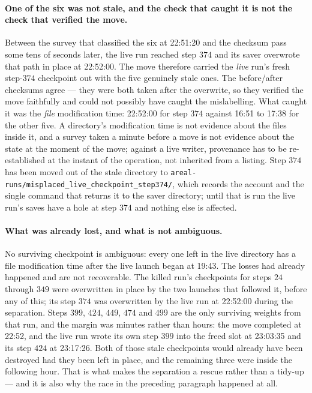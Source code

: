 \paragraph{One of the six was not stale, and the check that caught it is not the check that
verified the move.} Between the survey that classified the six at 22:51:20 and the checksum
pass some tens of seconds later, the live run reached step $374$ and its saver overwrote that
path in place at 22:52:00. The move therefore carried the \emph{live} run's fresh step-$374$
checkpoint out with the five genuinely stale ones. The before/after checksums agree --- they
were both taken after the overwrite, so they verified the move faithfully and could not
possibly have caught the mislabelling. What caught it was the \emph{file} modification time:
22:52:00 for step $374$ against 16:51 to 17:38 for the other five. A directory's modification
time is not evidence about the files inside it, and a survey taken a minute before a move is not
evidence about the state at the moment of the move; against a live writer, provenance has to be
re-established at the instant of the operation, not inherited from a listing. Step $374$ has
been moved out of the stale directory to
\texttt{areal-runs/\allowbreak misplaced\_live\_\allowbreak checkpoint\_step374/}, which records the account and the
single command that returns it to the saver directory; until that is run the live run's saves
have a hole at step $374$ and nothing else is affected.

\paragraph{What was already lost, and what is not ambiguous.} No surviving checkpoint is
ambiguous: every one left in the live directory has a file modification time after the live
launch began at 19:43. The losses had already happened and are not recoverable. The killed
run's checkpoints for steps $24$ through $349$ were overwritten in place by the two launches
that followed it, before any of this; its step $374$ was overwritten by the live run at
22:52:00 during the separation. Steps $399$, $424$, $449$, $474$ and $499$ are the only
surviving weights from that run, and the margin was minutes rather than hours: the move
completed at 22:52, and the live run wrote its own step $399$ into the freed slot at 23:03:35
and its step $424$ at 23:17:26. Both of those stale checkpoints would already have been
destroyed had they been left in place, and the remaining three were inside the following hour.
That is what makes the separation a rescue rather than a tidy-up --- and it is also why the
race in the preceding paragraph happened at all.

